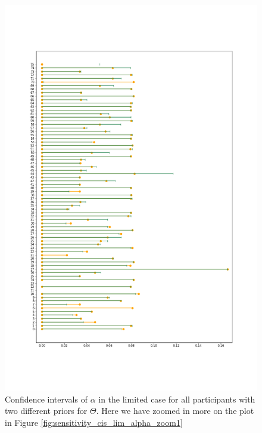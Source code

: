 \begin{figure}
    \centering
    \includegraphics[scale=0.36]{pictures/Sensitivity/ci_lim_alpha_zoom2.png}
    \caption[CIs for $\alpha$ in the limited case, zoomed]{   Confidence intervals of $\alpha$ in the limited case for all participants with two different priors for $\Theta$. Here we have zoomed in more on the plot in Figure \ref{fig:sensitivity_cis_lim_alpha_zoom1}}
    \label{fig:sensitivity_cis_lim_alpha_zoom2}
\end{figure}

